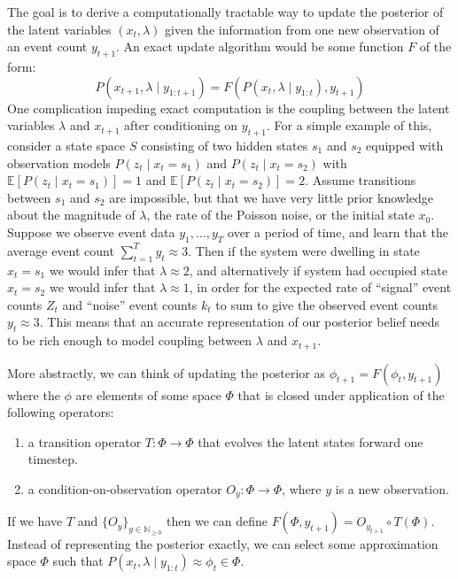 \documentclass[twoside, 11pt]{article}
\newcommand{\nonnegint}[0] {\mathbb{N}_{\geq 0}}
\newcommand{\E}[0] {\mathbb{E}} %
\begin{document}
The goal is to derive a computationally tractable way to update the posterior of the latent variables $(x_t, \lambda)$ given the information from one new observation of an event count $y_{t+1}$. An exact update algorithm would be some function $F$ of the form:
\begin{equation}
P(x_{t+1}, \lambda \mid y_{1:t+1}) = F\left( P(x_t, \lambda \mid y_{1:t}), y_{t+1}\right)
\end{equation}
One complication impeding exact computation is the coupling between the latent variables $\lambda$ and $x_{t+1}$ after conditioning on $y_{t+1}$. For a simple example of this, consider a state space $S$ consisting of two hidden states $s_1$ and $s_2$ equipped with observation models $P(z_t \mid x_t=s_1)$ and $P(z_t \mid x_t=s_2)$ with $\E \left[ P(z_t \mid x_t=s_1) \right] = 1$ and $\E \left[ P(z_t \mid x_t=s_2) \right] = 2$. Assume transitions between $s_1$ and $s_2$ are impossible, but that we have very little prior knowledge about the magnitude of $\lambda$, the rate of the Poisson noise, or the initial state $x_0$. Suppose we observe event data $y_1, \ldots, y_T$ over a period of time, and learn that the average event count $\sum_{t=1}^T y_t \approx 3$.  Then if the system were dwelling in state $x_t=s_1$ we would infer that $\lambda \approx 2$, and alternatively if system had occupied state $x_t=s_2$ we would infer that $\lambda \approx 1$, in order for the expected rate of ``signal'' event counts $Z_t$ and ``noise'' event counts $k_t$ to sum to give the observed event counts $y_t \approx 3$. This means that an accurate representation of our posterior belief needs to be rich enough to model coupling between $\lambda$ and $x_{t+1}$.

More abstractly, we can think of updating the posterior as $\phi_{t+1} = F \left( \phi_t, y_{t+1} \right)$ where the $\phi$ are elements of some space $\Phi$ that is closed under application of the following operators:
\begin{enumerate}
\item a transition operator $T : \Phi \rightarrow \Phi$ that evolves the latent states forward one timestep.
\item a condition-on-observation operator $O_y : \Phi \rightarrow \Phi$, where $y$ is a new observation.
\end{enumerate}
If we have $T$ and $\{O_y\}_{y \in \nonnegint}$ then we can define $F(\Phi, y_{t+1}) = O_{y_{t+1}} \circ T (\Phi)$. Instead of representing the posterior exactly, we can select some approximation space $\Phi$ such that $P(x_t, \lambda \mid y_{1:t} ) \approx \phi_t \in \Phi$.
\end{document}
